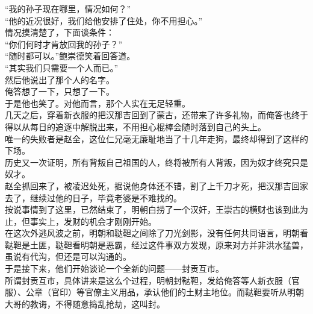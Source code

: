 \begin{multicols}{\theparacolNo}
“我的孙子现在哪里，情况如何？”\\

“他的近况很好，我们给他安排了住处，你不用担心。”\\

情况摸清楚了，下面谈条件：\\

“你们何时才肯放回我的孙子？”\\

“随时都可以。”鲍崇德笑着回答道。\\

“其实我们只需要一个人而已。”\\

然后他说出了那个人的名字。\\

俺答想了一下，只想了一下。\\

于是他也笑了。对他而言，那个人实在无足轻重。\\

几天之后，穿着新衣服的把汉那吉回到了蒙古，还带来了许多礼物，而俺答也终于得以从每日的追逐中解脱出来，不用担心棍棒会随时落到自己的头上。\\

唯一的失败者是赵全，这位仁兄毫无廉耻地当了十几年走狗，最终却得到了这样的下场。\\

历史又一次证明，所有背叛自己祖国的人，终将被所有人背叛，因为奴才终究只是奴才。\\

赵全抓回来了，被凌迟处死，据说他身体还不错，割了上千刀才死，把汉那吉回家去了，继续过他的日子，毕竟老婆是不难找的。\\

按说事情到了这里，已然结束了，明朝白捞了一个汉奸，王崇古的横财也该到此为止，但事实上，发财的机会才刚刚开始。\\

在这次外逃风波之前，明朝和鞑靼之间除了刀光剑影，没有任何共同语言，明朝看鞑靼是土匪，鞑靼看明朝是恶霸，经过这件事双方发现，原来对方并非洪水猛兽，虽说有代沟，但还是可以沟通的。\\

于是接下来，他们开始谈论一个全新的问题——封贡互市。\\

所谓封贡互市，具体讲来是这么个过程，明朝封鞑靼，发给俺答等人新衣服（官服）、公章（官印）等官僚主义用品，承认他们的土财主地位。而鞑靼要听从明朝大哥的教诲，不得随意捣乱抢劫，这叫封。\\


\end{multicols}
